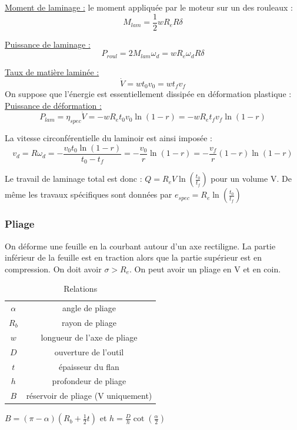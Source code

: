 \documentclass[../main.tex]{subfiles}
\begin{document}
\quad \underline{Moment de laminage :} le moment appliquée par le moteur sur un des rouleaux : \\
\begin{equation}
    M_{lam} = \frac{1}{2} w R_e R \delta
\end{equation}

\underline{Puissance de laminage :} \begin{equation}
    P_{roul} = 2 M_{lam} \omega_d = w R_e \omega_d R \delta
\end{equation}

\underline{Taux de matière laminée :} \begin{equation}
    \dot{V} = w t_0 v_0 = w t_f v_f
\end{equation}
On suppose que l'énergie est essentiellement dissipée en déformation plastique : \\
\underline{Puissance de déformation :}\begin{equation}
    P_{lam} = \eta_{spec} \dot{V} = -w R_e t_0v_0 \ln(1-r) = -w R_e t_fv_f\ln(1-r)
\end{equation}

La vitesse circonférentielle du laminoir est ainsi imposée : \\
\begin{equation}
    v_d = R \omega_d = -\frac{v_0t_0 \ln(1-r)}{t_0-t_f} = -\frac{v_0}{r}\ln(1-r) = -\frac{v_f}{r}(1-r) \ln(1-r)
\end{equation}

Le travail de laminage total est donc : $Q = R_e V \ln(\frac{t_0}{t_f})$ pour un volume V. De même les travaux spécifiques sont données par $e_{spec} = R_e \ln(\frac{t_0}{t_f})$\\


\subsubsection{Pliage}
On déforme une feuille en la courbant autour d'un axe rectiligne. La partie inférieur de la feuille est en traction alors que la partie supérieur est en compression. On doit avoir $\sigma> R_e$. On peut avoir un pliage en V et en coin.\\

\begin{table}[hbt!]
    \centering
    \begin{tabular}{c|c}
        $\alpha$ & angle de pliage \\
        $R_b$ & rayon de pliage\\
        $w$ & longueur de l'axe de pliage\\
        $D$ & ouverture de l'outil\\
        $t$ & épaisseur du flan\\
        $h$ & profondeur de pliage\\
        $B$ & réservoir de pliage (V uniquement)\\
    \end{tabular}
    \caption{Relations}
\end{table}
$B = (\pi-\alpha) (R_b+ \frac{1}{2}t)$ et $h = \frac{D}{h} \cot(\frac{\alpha}{2})$\\
\end{document}
